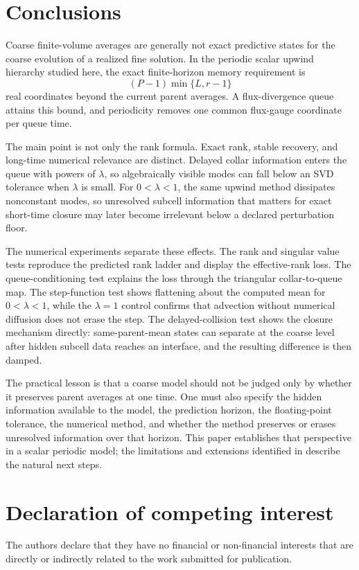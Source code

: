 \documentclass[preprint,12pt]{elsarticle}
\theoremstyle{plain}
\theoremstyle{remark}
\theoremstyle{definition}
\begin{document}
\section{Conclusions} \label{sec:conc}

Coarse finite-volume averages are generally not exact predictive states for
the coarse evolution of a realized fine solution.  In the periodic scalar
upwind hierarchy studied here, the exact finite-horizon memory requirement
is
\[
  (P-1)\min\{L,r-1\}
\]
real coordinates beyond the current parent averages.  A flux-divergence
queue attains this bound, and periodicity removes one common flux-gauge
coordinate per queue time.

The main point is not only the rank formula.  Exact rank, stable recovery, and long-time numerical relevance are distinct.
Delayed collar information enters the queue with powers of \(\lambda\), so
algebraically visible modes can fall below an SVD tolerance when \(\lambda\)
is small.  For \(0<\lambda<1\), the same upwind method dissipates nonconstant modes, so unresolved subcell information that matters for exact short-time closure may later become irrelevant below a declared perturbation floor.

The numerical experiments separate these effects. The rank and singular value tests reproduce the predicted rank ladder and display the effective-rank loss. The queue-conditioning test explains the loss through the triangular
collar-to-queue map.  The step-function test shows flattening about the computed mean for \(0<\lambda<1\), while the \(\lambda=1\) control confirms that advection without numerical diffusion does not erase the step.  The delayed-collision test shows the closure mechanism directly: same-parent-mean states can separate at the coarse level after hidden subcell data reaches an interface, and the resulting difference is then damped.

The practical lesson is that a coarse model should not be judged only by
whether it preserves parent averages at one time.  One must also specify the
hidden information available to the model, the prediction horizon, the
floating-point tolerance, the numerical method, and whether the method
preserves or erases unresolved information over that horizon.  This paper establishes that perspective in a scalar periodic model; the limitations and extensions identified in  describe the natural next steps.

\section*{Declaration of competing interest}
The authors declare that they have no financial or non-financial interests
that are directly or indirectly related to the work submitted for
publication.
\end{document}
